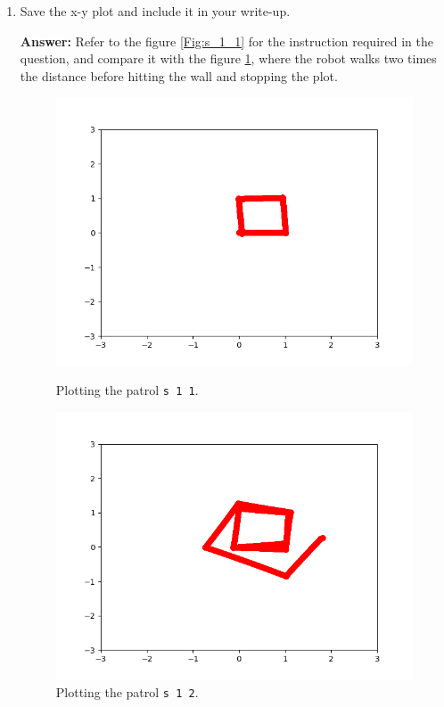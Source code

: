 \documentclass[12pt]{article}
\begin{document}
\begin{enumerate}
\begin{enumerate}
        \item Save the x-y plot and include it in your write-up.
        
        \textbf{Answer: }Refer to the figure \ref{Fig:s_1_1} for the instruction required in the question, and compare it with the figure \ref{Fig:s_1_2}, where the robot walks two times the distance before hitting the wall and stopping the plot.

        \begin{figure}[!htb]
          \begin{minipage}{0.48\textwidth}
            \centering
            \includegraphics[width=\linewidth]{lab1figure/patrol_plot_1.png}\vspace{-10pt}
            \caption{Plotting the patrol \texttt{s 1 1}.}\label{Fig:s_1_1}
          \end{minipage}\hfill
          \begin{minipage}{0.48\textwidth}
            \centering
            \includegraphics[width=\linewidth]{lab1figure/patrol_plot_2.png}\vspace{-10pt}
            \caption{Plotting the patrol \texttt{s 1 2}.}\label{Fig:s_1_2}
          \end{minipage}
       \end{figure}


\end{enumerate}
\end{enumerate}
\end{document}
